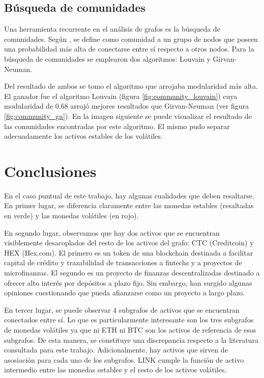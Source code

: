 \documentclass[runningheads,legalpaper,10pt]{etc/llncs}
\let\stdsection\section
\renewcommand\section{\newpage\stdsection}
\begin{document}
\subsection{Búsqueda de comunidades}

Una herramienta recurrente en el análisis de grafos es la búsqueda de comunidades. Según \cite{networkscience}, se define como comunidad a un grupo de nodos que poseen una probabilidad más alta de conectarse entre sí respecto a otros nodos. Para la búsqueda de comunidades se emplearon dos algoritmos: Louvain y Girvan-Neuman. 

Del resultado de ambos se tomo el algoritmo que arrojaba modularidad más alta. El ganador fue el algoritmo Louvain (figura \ref{fig:community_louvain}) cuya modularidad de 0.68 arrojó mejores resultados que Girvan-Neuman (ver figura \ref{fig:community_gn}). En la imagen siguiente se puede visualizar el resultado de las comunidades encontradas por este algoritmo. El mismo pudo separar adecuadamente los activos estables de los volátiles.

\section{Conclusiones}

En el caso puntual de este trabajo, hay algunas cualidades que deben resaltarse. En primer lugar, se diferencia claramente entre las monedas estables (resaltadas en verde) y las monedas volátiles (en rojo). 

En segundo lugar, observamos que hay dos activos que se encuentran visiblemente desacoplados del resto de los activos del grafo: CTC (Creditcoin) y HEX (Hex.com). El primero es un token de una blockchain destinada a facilitar capital de crédito y trazabilidad de transacciones a fintechs y a proyectos de microfinanzas. El segundo es un proyecto de finanzas descentralizadas destinado a ofrecer alto interés por depósitos a plazo fijo. Sin embargo, han surgido algunas opiniones cuestionando que pueda afianzarse como un proyecto a largo plazo.

En tercer lugar, se puede observar 4 subgrafos de activos que se encuentran conectados entre sí. Lo que es particularmente interesante son los tres subgrafos de monedas volátiles ya que ni ETH ni BTC son los activos de referencia de esos subgrafos. De esta manera, se constituye una discrepancia respecto a la literatura consultada para este trabajo.
Adicionalmente, hay activos que sirven de asosiación para cada uno de los subgrafos. LINK cumple la función de activo intermedio entre las monedas estables y el resto de los activos volátiles.
\end{document}
